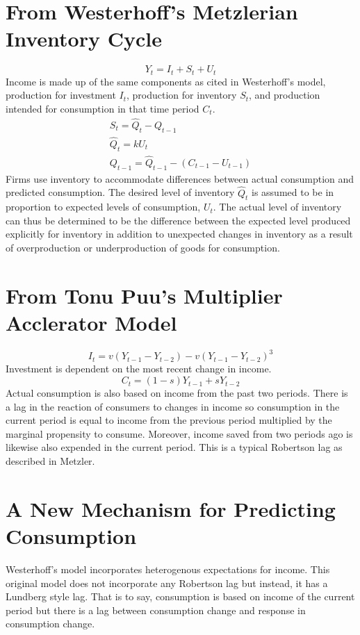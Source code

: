 \documentclass[]{article}
\begin{document}
\section*{From Westerhoff's Metzlerian Inventory Cycle}
\begin{equation}
	Y_t=I_t+S_t+U_t
\end{equation}
Income is made up of the same components as cited in Westerhoff's model, production for investment $I_t$, production for inventory $S_t$, and production intended for consumption in that time period $C_t$.
\begin{gather}
	S_t=\hat Q_t -Q_{t-1}\\
	\hat Q_t=k U_t\\
	Q_{t-1}=\hat Q_{t-1}-(C_{t-1}-U_{t-1})
\end{gather}
Firms use inventory to accommodate differences between actual consumption and predicted consumption. The desired level of inventory $\hat Q_t$ is assumed to be in proportion to expected levels of consumption, $U_t$. The actual level of inventory can thus be determined to be the difference between the expected level produced explicitly for inventory in addition to unexpected changes in inventory as a result of overproduction or underproduction of goods for consumption.
\section*{From Tonu Puu's Multiplier Acclerator Model}
\begin{equation}
	I_t=v(Y_{t-1}-Y_{t-2})-v(Y_{t-1}-Y_{t-2})^3
\end{equation}
Investment is dependent on the most recent change in income.
\begin{equation}
	C_t=(1-s)Y_{t-1}+sY_{t-2}
\end{equation}
Actual consumption is also based on income from the past two periods. There is a lag in the reaction of consumers to changes in income so consumption in the current period is equal to income from the previous period multiplied by the marginal propensity to consume. Moreover, income saved from two periods ago is likewise also expended in the current period. This is a typical Robertson lag as described in Metzler.
\section*{A New Mechanism for Predicting Consumption}
Westerhoff's model incorporates heterogenous expectations for income. This original model does not incorporate any Robertson lag but instead, it has a Lundberg style lag. That is to say, consumption is based on income of the current period but there is a lag between consumption change and response in consumption change. 
\end{document}
